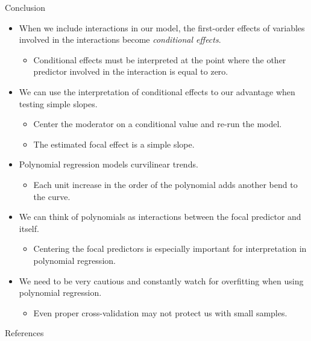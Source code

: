 \documentclass{beamer}\usepackage[]{graphicx}\usepackage[]{color}
\begin{document}
\begin{frame}[allowframebreaks]{Conclusion}
\begin{itemize}
  \pagebreak
  
  \item When we include interactions in our model, the first-order effects of 
    variables involved in the interactions become \emph{conditional effects}.
    \vc
    \begin{itemize}
    \item Conditional effects must be interpreted at the point where the other 
      predictor involved in the interaction is equal to zero.
    \end{itemize}
    \vb
  \item We can use the interpretation of conditional effects to our advantage 
    when testing simple slopes.
    \vc
    \begin{itemize}
    \item Center the moderator on a conditional value and re-run the model.
      \vc
    \item The estimated focal effect is a simple slope.
    \end{itemize}
  
    \pagebreak
    
  \item Polynomial regression models curvilinear trends.
    \vc
    \begin{itemize}
    \item Each unit increase in the order of the polynomial adds another bend to
      the curve.
    \end{itemize}
    \vb
  \item We can think of polynomials as interactions between the focal predictor 
    and itself.
    \vc
    \begin{itemize}
    \item Centering the focal predictors is especially important for 
      interpretation in polynomial regression.
    \end{itemize}
    \vb
  \item We need to be very cautious and constantly watch for overfitting when 
    using polynomial regression.
    \vc
    \begin{itemize}
    \item Even proper cross-validation may not protect us with small samples.
    \end{itemize}
  \end{itemize}
  
\end{frame}
  

\begin{frame}[allowframebreaks]{References}

  
  

\end{frame}
\end{document}
